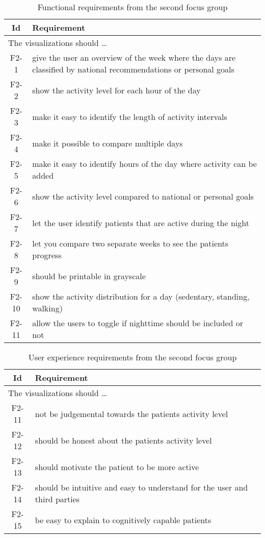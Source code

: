 \begin{table}[h!]
  \begin{center}
  \begin{tabular}{|c|p{12cm}|}
    \hline
      \textbf{Id} & \textbf{Requirement} \\ \hline
    \multicolumn{2}{|l|}{The visualizations should \ldots} \\ \hline
      F2-1 & give the user an overview of the week where the days are classified by national recommendations or personal goals \\ \hline
      F2-2 & show the activity level for each hour of the day \\ \hline
      F2-3 & make it easy to identify the length of activity intervals \\ \hline
      F2-4 & make it possible to compare multiple days \\ \hline
      F2-5 & make it easy to identify hours of the day where activity can be added \\ \hline
      F2-6 & show the activity level compared to national or personal goals \\ \hline
      F2-7 & let the user identify patients that are active during the night \\ \hline
      F2-8 & let you compare two separate weeks to see the patients progress \\ \hline
      F2-9 & should be printable in grayscale \\ \hline
      F2-10 & show the activity distribution for a day (sedentary, standing, walking) \\ \hline
      F2-11 & allow the users to toggle if nighttime should be included or not \\ \hline
  \end{tabular}
  \end{center}
  \caption{Functional requirements from the second focus group}
  \label{tab:f2ReqCon}
\end{table}

\begin{table}[h!]
  \begin{center}
  \begin{tabular}{|c|p{12cm}|}
    \hline
      \textbf{Id} & \textbf{Requirement} \\ \hline
    \multicolumn{2}{|l|}{The visualizations should \ldots} \\ \hline
      F2-11 & not be judgemental towards the patients activity level \\ \hline
      F2-12 & should be honest about the patients activity level \\ \hline
      F2-13 & should motivate the patient to be more active \\ \hline
      F2-14 & should be intuitive and easy to understand for the user and third parties \\ \hline
      F2-15 & be easy to explain to cognitively capable patients \\ \hline
  \end{tabular}
  \end{center}
  \caption{User experience requirements from the second focus group}
  \label{tab:f2ReqUxCon}
\end{table}

